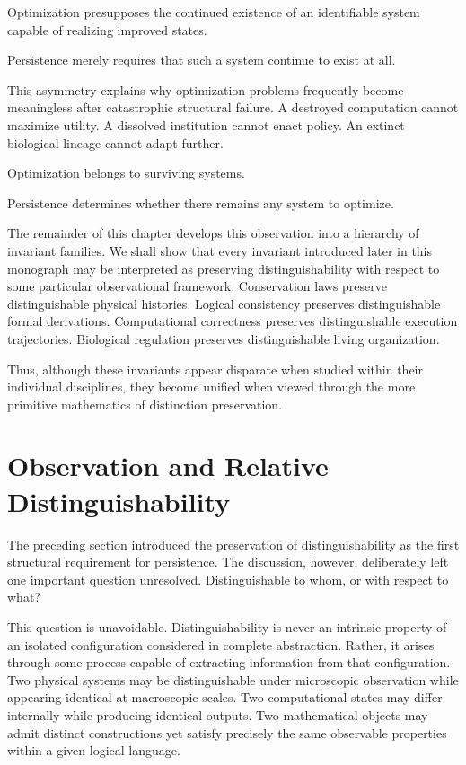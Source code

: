 \documentclass[11pt]{book}
\numberwithin{equation}{chapter}
\theoremstyle{definition}
\theoremstyle{plain}
\begin{document}
Optimization presupposes the continued existence of an identifiable system capable of realizing improved states.

Persistence merely requires that such a system continue to exist at all.

This asymmetry explains why optimization problems frequently become meaningless after catastrophic structural failure. A destroyed computation cannot maximize utility. A dissolved institution cannot enact policy. An extinct biological lineage cannot adapt further.

Optimization belongs to surviving systems.

Persistence determines whether there remains any system to optimize.

The remainder of this chapter develops this observation into a hierarchy of invariant families. We shall show that every invariant introduced later in this monograph may be interpreted as preserving distinguishability with respect to some particular observational framework. Conservation laws preserve distinguishable physical histories. Logical consistency preserves distinguishable formal derivations. Computational correctness preserves distinguishable execution trajectories. Biological regulation preserves distinguishable living organization.

Thus, although these invariants appear disparate when studied within their individual disciplines, they become unified when viewed through the more primitive mathematics of distinction preservation.

\section{Observation and Relative Distinguishability}

The preceding section introduced the preservation of distinguishability as the first structural requirement for persistence. The discussion, however, deliberately left one important question unresolved. Distinguishable to whom, or with respect to what?

This question is unavoidable. Distinguishability is never an intrinsic property of an isolated configuration considered in complete abstraction. Rather, it arises through some process capable of extracting information from that configuration. Two physical systems may be distinguishable under microscopic observation while appearing identical at macroscopic scales. Two computational states may differ internally while producing identical outputs. Two mathematical objects may admit distinct constructions yet satisfy precisely the same observable properties within a given logical language.
\end{document}
